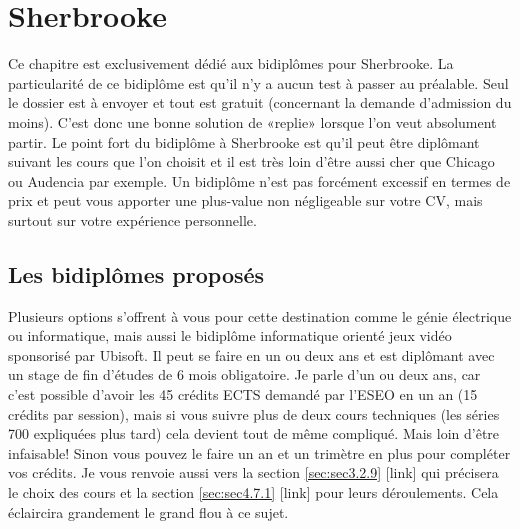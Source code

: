 \chapter{Sherbrooke}\label{ch:ch3label}

Ce chapitre est exclusivement dédié aux bidiplômes pour Sherbrooke. La particularité de ce bidiplôme est qu’il n’y a aucun test à passer au préalable. Seul le dossier est à envoyer et tout est gratuit (concernant la demande d’admission du moins). C’est donc une bonne solution de «replie» lorsque l’on veut absolument partir. Le point fort du bidiplôme à Sherbrooke est qu’il peut être diplômant suivant les cours que l’on choisit et il est très loin d’être aussi cher que Chicago ou Audencia par exemple. Un bidiplôme n’est pas forcément excessif en termes de prix et peut vous apporter une plus-value non négligeable sur votre CV, mais surtout sur votre expérience personnelle.

\section{Les bidiplômes proposés}\label{sec:sec3.1}

Plusieurs options s'offrent à vous pour cette destination comme le génie électrique ou informatique, mais aussi le bidiplôme informatique orienté jeux vidéo sponsorisé par Ubisoft. Il peut se faire en un ou deux ans et est diplômant avec un stage de fin d'études de 6 mois obligatoire. Je parle d'un ou deux ans, car c'est possible d'avoir les 45 crédits ECTS demandé par l'ESEO en un an (15 crédits par session), mais si vous suivre plus de deux cours techniques (les séries 700 expliquées plus tard) cela devient tout de même compliqué. Mais loin d'être infaisable! Sinon vous pouvez le faire un an et un trimètre en plus pour compléter vos crédits.
Je vous renvoie aussi vers la section \ref{sec:sec3.2.9} [link] qui précisera le choix des cours et la section \ref{sec:sec4.7.1} [link] pour leurs déroulements. Cela éclaircira grandement le grand flou à ce sujet.


